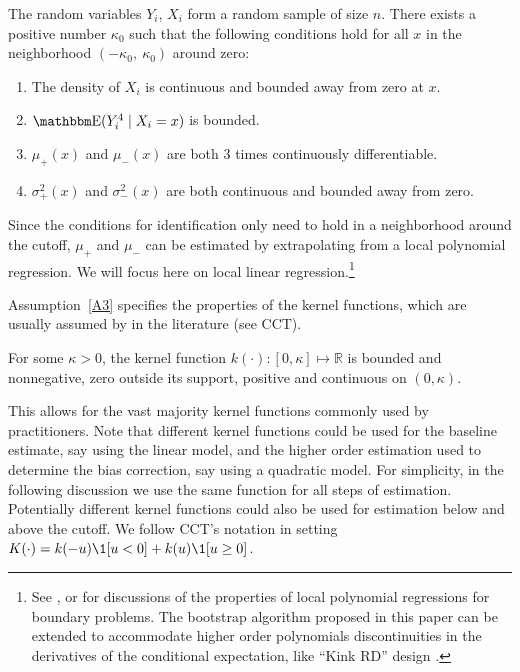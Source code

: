 \documentclass[12pt,fleqn]{article}
\begin{document}
\begin{assumption}\label{A1}
  The random variables $Y_i$, $X_i$ form a random sample of size $n$.
  There exists a positive number $\kappa_0$ such that the following
  conditions hold for all $x$ in the neighborhood $(-\kappa_{0},\ \kappa_{0})$
  around zero:
  \begin{enumerate}
  \item The density of $X_i$ is continuous and bounded away from zero at $x$.
  \item $\E(Y_{i}^{4} \mid X_{i}=x)$ is bounded.
  \item $\mu_+(x)$ and $\mu_-(x)$ are both 3 times continuously differentiable.
  \item $\sigma_+^2(x)$ and $\sigma_-^2(x)$ are both continuous and bounded away
    from zero.
 \end{enumerate}
\end{assumption}

Since the conditions for identification only need to hold in a neighborhood
around the cutoff, $\mu_+$ and $\mu_-$ can be estimated by extrapolating from a
local polynomial regression.  We will focus here on local linear
regression.\footnote{%
  See \cite{HTV2001}, \cite{Porter03} or \cite{FanGijbels92} for discussions of
  the properties of local polynomial regressions for boundary problems. The
  bootstrap algorithm proposed in this paper can be extended to accommodate
  higher order polynomials discontinuities in the derivatives of the conditional
  expectation, like ``Kink RD'' design \citep{card2009b}.} %

Assumption~\ref{A3} specifies the properties of the kernel functions, which are usually assumed by in the literature (see CCT).
\begin{assumption}[Kernel]\label{A3}
  For some $\kappa>0$, the kernel function $k(\cdot):[0, \kappa]\mapsto \mathbb{R}$ is bounded and nonnegative, zero outside its support, positive and continuous on $(0, \kappa)$.
\end{assumption}

This allows for the vast majority kernel functions commonly used by practitioners. Note that different kernel functions could be used for the baseline estimate, say using the linear model, and the higher order estimation used to determine the bias correction, say using a quadratic model. For simplicity, in the following discussion we use the same function for all steps of estimation.
Potentially different kernel functions could also be used for estimation below and above the cutoff. We follow CCT's notation in setting $K(\cdot)=k(-u)\1[u<0]+k(u)\1[u \geq 0]$.
\end{document}
